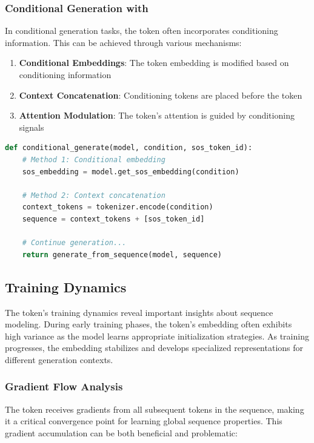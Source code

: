 \subsubsection{Conditional Generation with \sos{}}

In conditional generation tasks, the \sos{} token often incorporates conditioning information. This can be achieved through various mechanisms:

\begin{enumerate}
\item \textbf{Conditional Embeddings}: The \sos{} token embedding is modified based on conditioning information
\item \textbf{Context Concatenation}: Conditioning tokens are placed before the \sos{} token
\item \textbf{Attention Modulation}: The \sos{} token's attention is guided by conditioning signals
\end{enumerate}

\begin{lstlisting}[language=Python, caption=Conditional generation with \sos{} token]
def conditional_generate(model, condition, sos_token_id):
    # Method 1: Conditional embedding
    sos_embedding = model.get_sos_embedding(condition)
    
    # Method 2: Context concatenation
    context_tokens = tokenizer.encode(condition)
    sequence = context_tokens + [sos_token_id]
    
    # Continue generation...
    return generate_from_sequence(model, sequence)
\end{lstlisting}

\subsection{Training Dynamics}

The \sos{} token's training dynamics reveal important insights about sequence modeling. During early training phases, the \sos{} token's embedding often exhibits high variance as the model learns appropriate initialization strategies. As training progresses, the embedding stabilizes and develops specialized representations for different generation contexts.

\subsubsection{Gradient Flow Analysis}

The \sos{} token receives gradients from all subsequent tokens in the sequence, making it a critical convergence point for learning global sequence properties. This gradient accumulation can be both beneficial and problematic:


